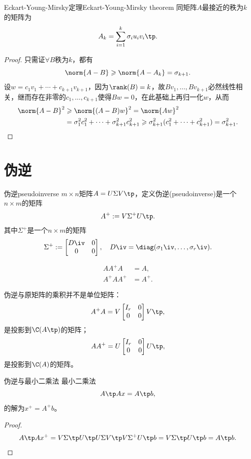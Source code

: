 \begin{theorem}{Eckart-Young-Mirsky定理}{Eckart-Young-Mirsky theorem}
	同矩阵$A$最接近的秩为$k$的矩阵为
	\begin{equation}
		A_k=\sum_{i=1}^k\sigma_iu_iv_i\tp.
	\end{equation}
\end{theorem}
\begin{proof}
	只需证$\forall B$秩为$k$，都有
	\[
		\norm{A-B}\geqslant\norm{A-A_k}=\sigma_{k+1}.
	\]
	设$w=c_1v_1+\cdots+c_{k+1}v_{k+1}$，因为$\rank(B)=k$，故$Bv_1,\ldots,Bv_{k+1}$必然线性相关，继而存在非零的$c_1,\ldots,c_{k+1}$使得$Bw=0$，在此基础上再归一化$w$，从而
	\begin{align*}
		\norm{A-B}^2&\geqslant\norm{(A-B)w}^2=\norm{Aw}^2\\
		&=\sigma_1^2c_1^2+\cdots+\sigma_{k+1}^2c_{k+1}^2\geqslant\sigma_{k+1}^2(c_1^2+\cdots+c_{k+1}^2)=\sigma_{k+1}^2.
		\qedhere
	\end{align*}
\end{proof}

\section{伪逆}

\begin{definition}{伪逆}{pseudoinverse}
	$m\times n$矩阵$A=U\Sigma V\tp$，定义伪逆(pseudoinverse)是一个$n\times m$的矩阵
	\begin{equation}
		A^+:=V\Sigma^+U\tp.
	\end{equation}
	其中$\Sigma^+$是一个$n\times m$的矩阵
	\[
		\Sigma^+:=\begin{bmatrix}
			D\iv&0\\0&0
		\end{bmatrix},\quad D\iv=\diag(\sigma_1\iv,\ldots,\sigma_r\iv).
	\]
\end{definition}

\begin{corollary}
	\begin{subequations}
		\begin{align}
			AA^+A&=A,\\
			A^+AA^+&=A^+.
		\end{align}
	\end{subequations}
\end{corollary}

\begin{remark}
	伪逆与原矩阵的乘积并不是单位矩阵：
	\[
		A^+A=V\begin{bmatrix}
			I_r&0\\0&0
		\end{bmatrix}V\tp,
	\]
	是投影到$\C(A\tp)$的矩阵；
	\[
		AA^+=U\begin{bmatrix}
			I_r&0\\0&0
		\end{bmatrix}U\tp,
	\]
	是投影到$\C(A)$的矩阵。
\end{remark}
\begin{theorem}{伪逆与最小二乘法}{}
	最小二乘法
	\[
		A\tp Ax=A\tp b,
	\]
	的解为$x^+=A^+b$。
\end{theorem}
\begin{proof}
	\[
		A\tp Ax^+=V\Sigma\tp U\tp U\Sigma V\tp V\Sigma^+U\tp b=V\Sigma\tp U\tp b=A\tp b.
		\qedhere
	\]
\end{proof}
